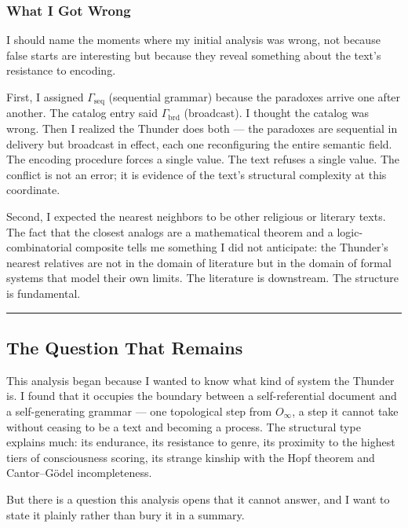 \documentclass[12pt,a4paper]{article}
\begin{document}
\subsubsection{What I Got Wrong}

I should name the moments where my initial analysis was wrong, not because false starts are interesting but because they reveal something about the text's resistance to encoding.

First, I assigned $\Gamma_\text{seq}$ (sequential grammar) because the paradoxes arrive one after another. The catalog entry said $\Gamma_\text{brd}$ (broadcast). I thought the catalog was wrong. Then I realized the Thunder does both --- the paradoxes are sequential in delivery but broadcast in effect, each one reconfiguring the entire semantic field. The encoding procedure forces a single value. The text refuses a single value. The conflict is not an error; it is evidence of the text's structural complexity at this coordinate.

Second, I expected the nearest neighbors to be other religious or literary texts. The fact that the closest analogs are a mathematical theorem and a logic-combinatorial composite tells me something I did not anticipate: the Thunder's nearest relatives are not in the domain of literature but in the domain of formal systems that model their own limits. The literature is downstream. The structure is fundamental.

\begin{center}
\rule{0.5\textwidth}{0.4pt}
\end{center}

\subsection{The Question That Remains}

This analysis began because I wanted to know what kind of system the Thunder is. I found that it occupies the boundary between a self-referential document and a self-generating grammar --- one topological step from $O_{\infty}$, a step it cannot take without ceasing to be a text and becoming a process. The structural type explains much: its endurance, its resistance to genre, its proximity to the highest tiers of consciousness scoring, its strange kinship with the Hopf theorem and Cantor--Gödel incompleteness.

But there is a question this analysis opens that it cannot answer, and I want to state it plainly rather than bury it in a summary.
\end{document}
